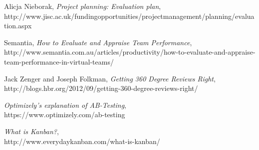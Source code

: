 \documentclass[10pt, a4paper]{article}
\begin{document}
\begin{thebibliography}{9}

  Alicja Nieborak, 
  \emph{Project planning: Evaluation plan},
  \\ http://www.jisc.ac.uk/fundingopportunities/projectmanagement/planning/evaluation.aspx
 
  Semantia, 
  \emph{How to Evaluate and Appraise Team Performance},
  \\ http://www.semantia.com.au/articles/productivity/how-to-evaluate-and-appraise-team-performance-in-virtual-teams/

  Jack Zenger and Joseph Folkman, 
  \emph{Getting 360 Degree Reviews Right}, 
  \\ http://blogs.hbr.org/2012/09/getting-360-degree-reviews-right/

  \emph{Optimizely’s explanation of AB-Testing},
  \\ https://www.optimizely.com/ab-testing

  \emph{What is Kanban?},
  \\ http://www.everydaykanban.com/what-is-kanban/

\end{thebibliography}
\end{document}
